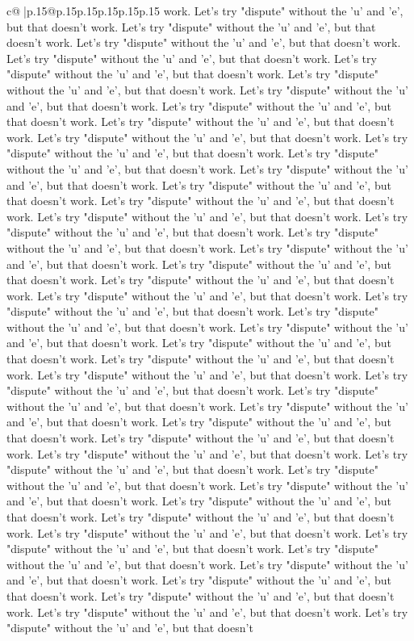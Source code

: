 \documentclass{article}
\begin{document}
{\begin{supertabular}{c@{$\;$}|p{.15\linewidth}@{}p{.15\linewidth}p{.15\linewidth}p{.15\linewidth}p{.15\linewidth}p{.15\linewidth}}
{{{work. Let's try "dispute" without the 'u' and 'e', but that doesn't work. Let's try "dispute" without the 'u' and 'e', but that doesn't work. Let's try "dispute" without the 'u' and 'e', but that doesn't work. Let's try "dispute" without the 'u' and 'e', but that doesn't work. Let's try "dispute" without the 'u' and 'e', but that doesn't work. Let's try "dispute" without the 'u' and 'e', but that doesn't work. Let's try "dispute" without the 'u' and 'e', but that doesn't work. Let's try "dispute" without the 'u' and 'e', but that doesn't work. Let's try "dispute" without the 'u' and 'e', but that doesn't work. Let's try "dispute" without the 'u' and 'e', but that doesn't work. Let's try "dispute" without the 'u' and 'e', but that doesn't work. Let's try "dispute" without the 'u' and 'e', but that doesn't work. Let's try "dispute" without the 'u' and 'e', but that doesn't work. Let's try "dispute" without the 'u' and 'e', but that doesn't work. Let's try "dispute" without the 'u' and 'e', but that doesn't work. Let's try "dispute" without the 'u' and 'e', but that doesn't work. Let's try "dispute" without the 'u' and 'e', but that doesn't work. Let's try "dispute" without the 'u' and 'e', but that doesn't work. Let's try "dispute" without the 'u' and 'e', but that doesn't work. Let's try "dispute" without the 'u' and 'e', but that doesn't work. Let's try "dispute" without the 'u' and 'e', but that doesn't work. Let's try "dispute" without the 'u' and 'e', but that doesn't work. Let's try "dispute" without the 'u' and 'e', but that doesn't work. Let's try "dispute" without the 'u' and 'e', but that doesn't work. Let's try "dispute" without the 'u' and 'e', but that doesn't work. Let's try "dispute" without the 'u' and 'e', but that doesn't work. Let's try "dispute" without the 'u' and 'e', but that doesn't work. Let's try "dispute" without the 'u' and 'e', but that doesn't work. Let's try "dispute" without the 'u' and 'e', but that doesn't work. Let's try "dispute" without the 'u' and 'e', but that doesn't work. Let's try "dispute" without the 'u' and 'e', but that doesn't work. Let's try "dispute" without the 'u' and 'e', but that doesn't work. Let's try "dispute" without the 'u' and 'e', but that doesn't work. Let's try "dispute" without the 'u' and 'e', but that doesn't work. Let's try "dispute" without the 'u' and 'e', but that doesn't work. Let's try "dispute" without the 'u' and 'e', but that doesn't work. Let's try "dispute" without the 'u' and 'e', but that doesn't work. Let's try "dispute" without the 'u' and 'e', but that doesn't work. Let's try "dispute" without the 'u' and 'e', but that doesn't work. Let's try "dispute" without the 'u' and 'e', but that doesn't work. Let's try "dispute" without the 'u' and 'e', but that doesn't work. Let's try "dispute" without the 'u' and 'e', but that doesn't work. Let's try "dispute" without the 'u' and 'e', but that doesn't work. Let's try "dispute" without the 'u' and 'e', but that doesn't work. Let's try "dispute" without the 'u' and 'e', but that doesn't work. Let's try "dispute" without the 'u' and 'e', but that doesn't work. Let's try "dispute" without the 'u' and 'e', but that doesn't }}}
\end{supertabular}}
\end{document}
